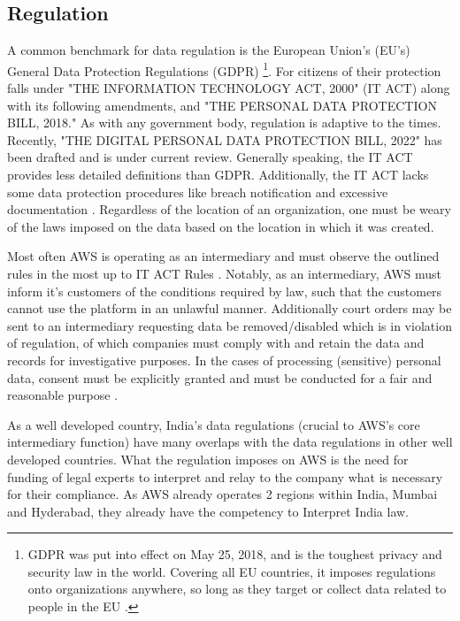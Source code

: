 \documentclass[a4paper, 12pt]{article}
\begin{document}
\subsection{Regulation}
A common benchmark for data regulation is the European Union's (EU's) General Data Protection Regulations (GDPR) \footnote{GDPR was put into effect on May 25, 2018, and is the toughest privacy and security law in the world. Covering all EU countries, it imposes regulations onto organizations anywhere, so long as they target or collect data related to people in the EU \cite{GDPR}.}.
For citizens of their protection falls under "THE INFORMATION TECHNOLOGY ACT, 2000" (IT ACT) along with its following amendments, and "THE PERSONAL DATA PROTECTION BILL, 2018."
As with any government body, regulation is adaptive to the times.
Recently, "THE DIGITAL PERSONAL DATA PROTECTION BILL, 2022" has been drafted and is under current review.
Generally speaking, the IT ACT provides less detailed definitions than GDPR.
Additionally, the IT ACT lacks some data protection procedures like breach notification and excessive documentation \cite[p.~18]{GDPR_AND_INDIA}.
Regardless of the location of an organization, one must be weary of the laws imposed on the data based on the location in which it was created.

Most often AWS is operating as an intermediary and must observe the outlined rules in the most up to IT ACT Rules \cite[p.~21-26]{INFORMATION_TECHNOLOGY_ACT_2021_RULES}.
Notably, as an intermediary, AWS must inform it's customers of the conditions required by law, such that the customers cannot use the platform in an unlawful manner.
Additionally court orders may be sent to an intermediary requesting data be removed/disabled which is in violation of regulation, of which companies must comply with and retain the data and records for investigative purposes.
In the cases of processing (sensitive) personal data, consent must be explicitly granted and must be conducted for a fair and reasonable purpose \cite[p.14-19]{PERSONAL_DATA_PROTECTION_BILL_2018}.

As a well developed country, India's data regulations (crucial to AWS's core intermediary function) have many overlaps with the data regulations in other well developed countries.
What the regulation imposes on AWS is the need for funding of legal experts to interpret and relay to the company what is necessary for their compliance.
As AWS already operates 2 regions within India, Mumbai and Hyderabad, they already have the competency to Interpret India law.
\end{document}
